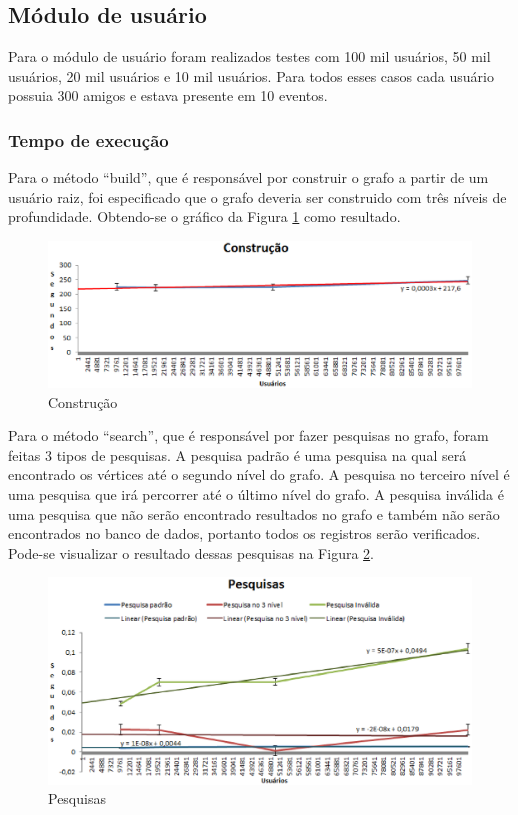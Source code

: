 \subsection{Módulo de usuário}

Para o módulo de usuário foram realizados testes com 100 mil usuários, 50 mil usuários, 20 mil usuários e 10 mil usuários. Para todos esses casos cada usuário possuia 300 amigos e estava presente em 10 eventos.

\subsubsection{Tempo de execução}

Para o método ``build'', que é responsável por construir o grafo a partir de um usuário raiz, foi especificado que o grafo deveria ser construido com três níveis de profundidade. Obtendo-se o gráfico da Figura \ref{build_tempo} como resultado.

\begin{figure}[!h]
	\centering
	\includegraphics[scale=0.8]{figuras/resultados/graficos/network/tempo/build.eps}
	\caption[Construção]{Construção}
	\label{build_tempo}
\end{figure}

Para o método ``search'', que é responsável por fazer pesquisas no grafo, foram feitas 3 tipos de pesquisas. A pesquisa padrão é uma pesquisa na qual será encontrado os vértices até o segundo nível do grafo. A pesquisa no terceiro nível é uma pesquisa que irá percorrer até o último nível do grafo. A pesquisa inválida é uma pesquisa que não serão encontrado resultados no grafo e também não serão encontrados no banco de dados, portanto todos os registros serão verificados. Pode-se visualizar o resultado dessas pesquisas na Figura \ref{search_tempo}.

\newpage

\begin{figure}[!h]
	\centering
	\includegraphics[scale=0.8]{figuras/resultados/graficos/network/tempo/pesquisas.eps}
	\caption[Pesquisas]{Pesquisas}
	\label{search_tempo}
\end{figure}


